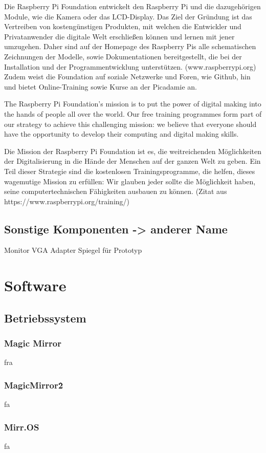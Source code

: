 \documentclass[12pt,a4paper]{report}
\begin{document}
Die Raspberry Pi Foundation entwickelt den Raspberry Pi und die dazugehörigen Module, wie die Kamera oder das LCD-Display. Das Ziel der Gründung ist das Vertreiben von kostengünstigen Produkten, mit welchen die Entwickler und Privatanwender die digitale Welt erschließen können und lernen mit jener umzugehen. Daher sind auf der Homepage des Raspberry Pis alle schematischen Zeichnungen der Modelle, sowie Dokumentationen bereitgestellt, die bei der Installation und der Programmentwicklung unterstützen. (www.raspberrypi.org)
Zudem weist die Foundation auf soziale Netzwerke und Foren, wie Github, hin und bietet Online-Training sowie Kurse an der Picadamie an.

The Raspberry Pi Foundation’s mission is to put the power of digital making into the hands of people all over the world. Our free training programmes form part of our strategy to achieve this challenging mission: we believe that everyone should have the opportunity to develop their computing and digital making skills.

Die Mission der Raspberry Pi Foundation ist es, die weitreichenden Möglichkeiten der Digitalisierung in die Hände der Menschen auf der ganzen Welt zu geben. Ein Teil dieser Strategie sind die kostenlosen Trainingsprogramme, die helfen, dieses wagemutige Mission zu erfüllen: Wir glauben jeder sollte die Möglichkeit haben, seine computertechnischen Fähigkeiten ausbauen zu können. (Zitat aus https://www.raspberrypi.org/training/)

\section{Sonstige Komponenten -> anderer Name}
Monitor VGA Adapter Spiegel für Prototyp
\chapter{Software}
\section{Betriebssystem}
\subsection*{Magic Mirror}
fra
\subsection*{MagicMirror\^2}
fa
\subsection*{Mirr.OS}
fa
\end{document}

